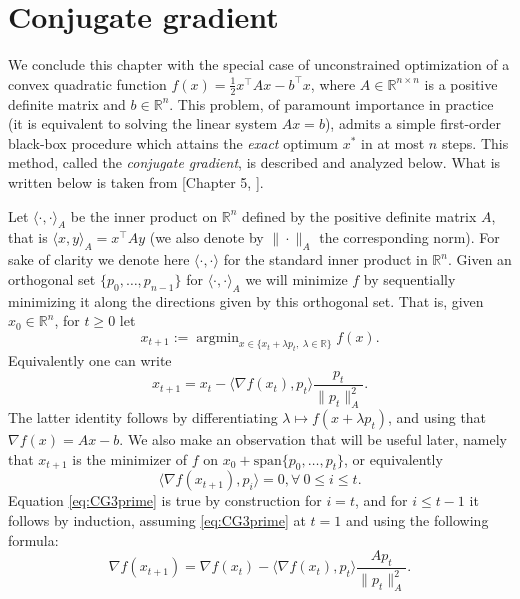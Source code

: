 \documentclass[openany]{now}
\newcommand{\R}{\mathbb{R}}
\newcommand{\argmin}{\mathop{\mathrm{argmin}}}
\begin{document}
\section{Conjugate gradient} \label{sec:CG}
We conclude this chapter with the special case of unconstrained optimization of a convex quadratic function $f(x) = \frac12 x^{\top} A x - b^{\top} x$, where $A \in \R^{n \times n}$ is a positive definite matrix and $b \in \R^n$. This problem, of paramount importance in practice (it is equivalent to solving the linear system $Ax = b$), admits a simple first-order black-box procedure which attains the {\em exact} optimum $x^*$ in at most $n$ steps. This method, called the {\em conjugate gradient}, is described and analyzed below. What is written below is taken from [Chapter 5, \cite{NW06}].

Let $\langle \cdot , \cdot\rangle_A$ be the inner product on $\R^n$ defined by the positive definite matrix $A$, that is $\langle x, y\rangle_A = x^{\top} A y$ (we also denote by $\|\cdot\|_A$ the corresponding norm). For sake of clarity we denote here $\langle \cdot , \cdot\rangle$ for the standard inner product in $\R^n$. Given an orthogonal set $\{p_0, \hdots, p_{n-1}\}$ for $\langle \cdot , \cdot \rangle_A$ we will minimize $f$ by sequentially minimizing it along the directions given by this orthogonal set. That is, given $x_0 \in \R^n$, for $t \geq 0$ let
\begin{equation} \label{eq:CG1}
x_{t+1} := \argmin_{x \in \{x_t + \lambda p_t, \ \lambda \in \R\}} f(x) .
\end{equation}
Equivalently one can write
\begin{equation} \label{eq:CG2}
x_{t+1} = x_t - \langle \nabla f(x_t) , p_t \rangle \frac{p_t}{\|p_t\|_A^2} .
\end{equation}
The latter identity follows by differentiating $\lambda \mapsto f(x + \lambda p_t)$, and using that $\nabla f(x) = A x - b$. We also make an observation that will be useful later, namely that $x_{t+1}$ is the minimizer of $f$ on $x_0 + \mathrm{span}\{p_0, \hdots, p_t\}$, or equivalently
\begin{equation} \label{eq:CG3prime}
\langle \nabla f(x_{t+1}), p_i \rangle = 0, \forall \ 0 \leq i \leq t.
\end{equation}
Equation \eqref{eq:CG3prime} is true by construction for $i=t$, and for $i \leq t-1$ it follows by induction, assuming \eqref{eq:CG3prime} at $t=1$ and using the following formula:
\begin{equation} \label{eq:CG3}
\nabla f(x_{t+1}) = \nabla f(x_{t}) - \langle \nabla f(x_{t}) , p_{t} \rangle \frac{A p_{t}}{\|p_t\|_A^2} .
\end{equation}
\end{document}
